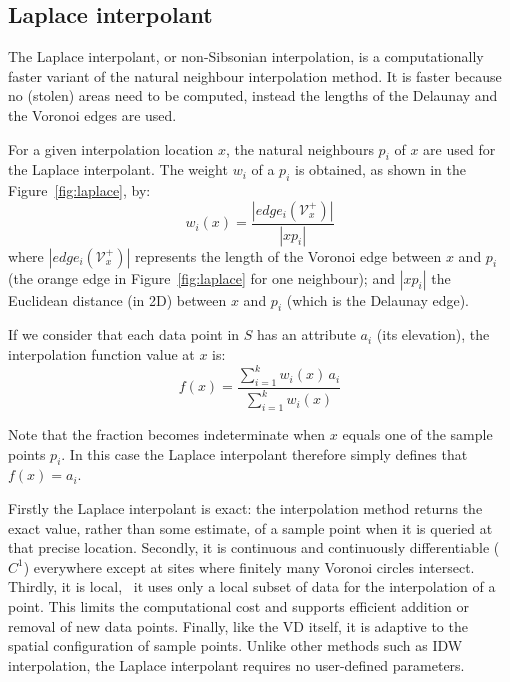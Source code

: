 \subsection{Laplace interpolant}
\label{sec:laplace}

The Laplace interpolant, or non-Sibsonian interpolation, is a computationally faster variant of the natural neighbour interpolation method.
It is faster because no (stolen) areas need to be computed, instead the lengths of the Delaunay and the Voronoi edges are used.

%

For a given interpolation location $x$, the natural neighbours $p_i$ of $x$ are used for the Laplace interpolant.
The weight $w_i$ of a $p_i$ is obtained, as shown in the Figure~\ref{fig:laplace}, by:
\begin{equation}
  w_{i}(x) = \frac{|edge_i(\mathcal{V}^{+}_{x})|}{|xp_i|}
  \label{eq:laplace}
\end{equation}
where $|edge_i(\mathcal{V}^{+}_{x})|$ represents the length of the Voronoi edge between $x$ and $p_i$ (the orange edge in Figure~\ref{fig:laplace} for one neighbour); 
and $|xp_i|$ the Euclidean distance (in 2D) between $x$ and $p_i$ (which is the Delaunay edge).

%

If we consider that each data point in $S$ has an attribute $a_{i}$ (its elevation), the interpolation function value at $x$ is:
\begin{equation}
  f(x) = \frac{\sum_{i=1}^{k} w_{i}(x) \, a_{i}}{\sum_{i=1}^{k} w_{i}(x)}
  \label{eq:laplace2}
\end{equation}

Note that the fraction becomes indeterminate when $x$ equals one of the sample points $p_i$. 
In this case the Laplace interpolant therefore simply defines that $f(x) = a_i$.

%

Firstly the Laplace interpolant is exact: the interpolation method returns the exact value, rather than some estimate, of a sample point when it is queried at that precise location. 
Secondly, it is continuous and continuously differentiable ($C^1$) everywhere except at sites where finitely many Voronoi circles intersect. 
Thirdly, it is local, \ie\ it uses only a local subset of data for the interpolation of a point. 
This limits the computational cost and supports efficient addition or removal of new data points. 
Finally, like the VD itself, it is adaptive to the spatial configuration of sample points. 
Unlike other methods such as IDW interpolation, the Laplace interpolant requires no user-defined parameters.



